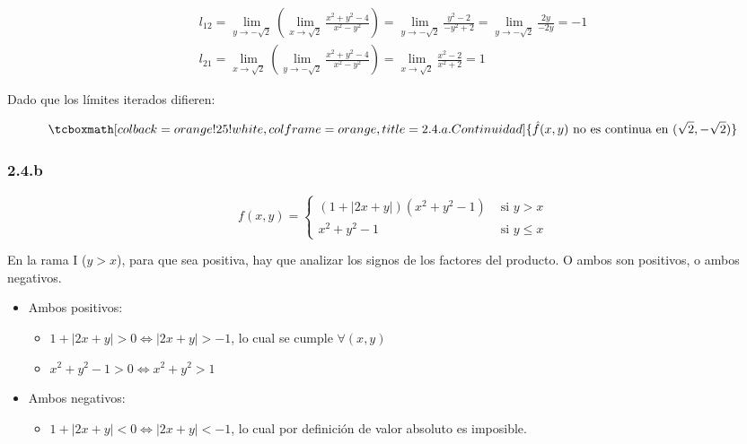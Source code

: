 \documentclass{article}
\begin{document}
\begin{subequations}
\begin{align}
l_{12} = \lim_{y \rightarrow -\sqrt{2}} \left( \lim_{x \rightarrow \sqrt{2}} \frac{x^2 + y^2 - 4}{x^2 - y^2} \right) = \lim_{y \rightarrow -\sqrt{2}} \frac{y^2 - 2}{-y^2 + 2} = \lim_{y \rightarrow -\sqrt{2}} \frac{2y}{-2y} = -1 \\
l_{21} = \lim_{x \rightarrow \sqrt{2}} \left( \lim_{y \rightarrow -\sqrt{2}} \frac{x^2 + y^2 - 4}{x^2 - y^2} \right) = \lim_{x \rightarrow \sqrt{2}} \frac{x^2 - 2}{x^2 + 2} = 1
\end{align}
\end{subequations}

Dado que los límites iterados difieren:

\begin{equation}
\tcboxmath[colback=orange!25!white,colframe=orange,title=2.4.a. Continuidad]
{ \hat{f}(x,y) \text{ no es continua en } (\sqrt{2}, -\sqrt{2}) }
\end{equation}

\subsubsection*{2.4.b}
\label{subsubsec:2.4.b}

\begin{equation}
f(x,y) = \left\{ \begin{array}{ll}
(1 + |2x + y|) (x^2 + y^2 - 1) &\text{ si } y > x \\
x^2 + y^2 - 1 &\text{ si } y \leq x
\end{array} \right.
\end{equation}

En la rama I ($y > x$), para que sea positiva, hay que analizar los signos de los factores del producto. O ambos son positivos, o ambos negativos.

\begin{itemize}
\item Ambos positivos:
	\begin{itemize}
		\item $1 + |2x + y| > 0 \Leftrightarrow |2x + y| > -1$, lo cual se cumple $\forall (x,y)$
		\item $x^2 + y^2 -1 > 0 \Leftrightarrow x^2 + y^2 > 1$
	\end{itemize}
\item Ambos negativos:
	\begin{itemize}
		\item $1 + |2x + y| < 0 \Leftrightarrow |2x + y| < -1$, lo cual por definición de valor absoluto es imposible.
	\end{itemize}
\end{itemize}
\end{document}
